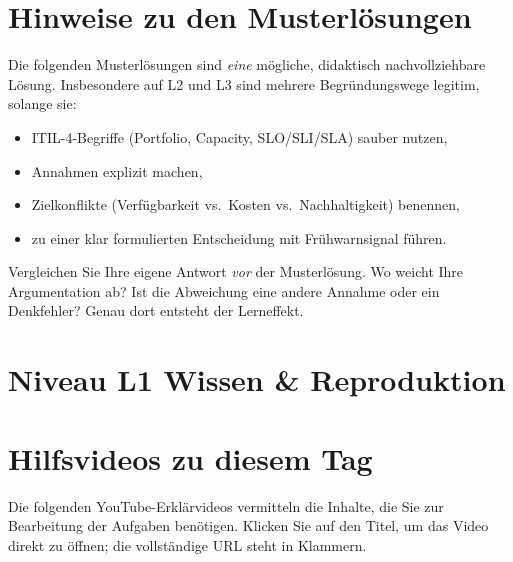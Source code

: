 \documentclass[11pt,a4paper,oneside]{article}
\begin{document}
\section*{Hinweise zu den Musterl\"osungen}
\thispagestyle{plain}

\noindent Die folgenden Musterl\"osungen sind \emph{eine} m\"ogliche, didaktisch nachvollziehbare L\"osung. Insbesondere auf L2 und L3 sind mehrere Begr\"undungswege legitim, solange sie:

\begin{itemize}
  \item ITIL-4-Begriffe (Portfolio, Capacity, SLO/SLI/SLA) sauber nutzen,
  \item Annahmen explizit machen,
  \item Zielkonflikte (Verf\"ugbarkeit vs.\ Kosten vs.\ Nachhaltigkeit) benennen,
  \item zu einer klar formulierten Entscheidung mit Fr\"uhwarnsignal f\"uhren.
\end{itemize}

\begin{infobox}
Vergleichen Sie Ihre eigene Antwort \emph{vor} der Musterl\"osung. Wo weicht Ihre Argumentation ab? Ist die Abweichung eine andere Annahme \textendash{} oder ein Denkfehler? Genau dort entsteht der Lerneffekt.
\end{infobox}

\clearpage

\section*{Niveau L1 \textendash{} Wissen \& Reproduktion}

\section*{Hilfsvideos zu diesem Tag}
\thispagestyle{plain}

\noindent Die folgenden YouTube-Erkl\"arvideos vermitteln die Inhalte, die Sie zur Bearbeitung der Aufgaben ben\"otigen. Klicken Sie auf den Titel, um das Video direkt zu \"offnen; die vollst\"andige URL steht in Klammern.
\end{document}
